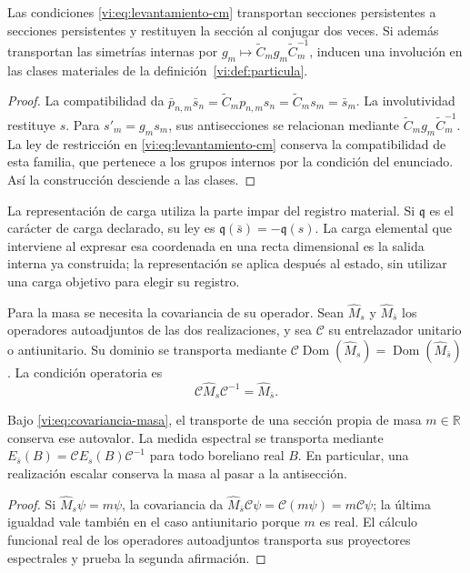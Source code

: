 \begin{proposition}
\label{vi:prop:antiseccion-persistente}
Las condiciones \eqref{vi:eq:levantamiento-cm} transportan secciones
persistentes a secciones persistentes y restituyen la sección al
conjugar dos veces. Si además transportan las simetrías internas por
$g_m\mapsto\widetilde C_mg_m\widetilde C_m^{-1}$, inducen una
involución en las clases materiales de la
definición~\ref{vi:def:particula}.
\end{proposition}
\begin{proof}
La compatibilidad da
$\bar p_{n,m}\bar s_n=\widetilde C_mp_{n,m}s_n
=\widetilde C_ms_m=\bar s_m$.
La involutividad restituye $s$. Para $s'_m=g_ms_m$, sus
antisecciones se relacionan mediante
$\widetilde C_mg_m\widetilde C_m^{-1}$. La ley de restricción
en \eqref{vi:eq:levantamiento-cm} conserva la compatibilidad de esta
familia, que pertenece a los grupos internos por la condición del
enunciado. Así la construcción desciende a las clases.
\end{proof}

La representación de carga utiliza la parte impar del registro
material. Si $\mathfrak q$ es el carácter de carga declarado, su
ley es $\mathfrak q(\bar s)=-\mathfrak q(s)$. La carga elemental
que interviene al expresar esa coordenada en una recta dimensional es
la salida interna ya construida; la representación se aplica después
al estado, sin utilizar una carga objetivo para elegir su registro.

Para la masa se necesita la covariancia de su operador. Sean
$\widehat M_s$ y $\widehat M_{\bar s}$ los operadores autoadjuntos
de las dos realizaciones, y sea $\mathcal C$ su entrelazador
unitario o antiunitario. Su dominio se transporta mediante
$\mathcal C\operatorname{Dom}(\widehat M_s)
=\operatorname{Dom}(\widehat M_{\bar s})$. La condición operatoria es
\begin{equation}
 \mathcal C\widehat M_s\mathcal C^{-1}
 =\widehat M_{\bar s}.
 \label{vi:eq:covariancia-masa}
\end{equation}

\begin{proposition}
\label{vi:prop:masa-conjugada}
Bajo \eqref{vi:eq:covariancia-masa}, el transporte de una sección
propia de masa $m\in\mathbb R$ conserva ese autovalor. La medida
espectral se transporta mediante
$E_{\bar s}(B)=\mathcal C E_s(B)\mathcal C^{-1}$ para todo
boreliano real $B$. En particular, una realización escalar conserva
la masa al pasar a la antisección.
\end{proposition}
\begin{proof}
Si $\widehat M_s\psi=m\psi$, la covariancia da
$\widehat M_{\bar s}\mathcal C\psi
=\mathcal C(m\psi)=m\mathcal C\psi$; la última igualdad
vale también en el caso antiunitario porque $m$ es real. El cálculo
funcional real de los operadores autoadjuntos transporta sus
proyectores espectrales y prueba la segunda afirmación.
\end{proof}

